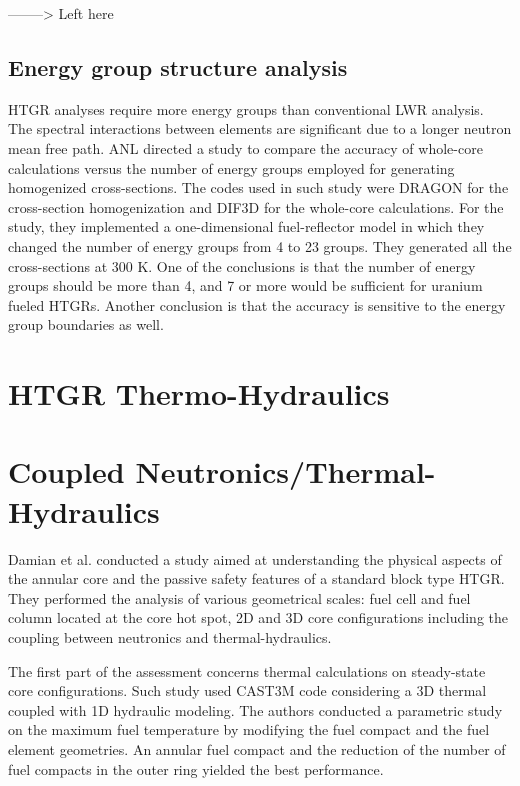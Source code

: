 \documentclass[11pt,letterpaper]{article}
\begin{document}
--------> Left here




\subsection{Energy group structure analysis}

\gls{HTGR} analyses require more energy groups than conventional \gls{LWR} analysis.
The spectral interactions between elements are significant due to a longer neutron mean free path.
\gls{ANL} directed a study \cite{lee_status_2006} to compare the accuracy of whole-core calculations versus the number of energy groups employed for generating homogenized cross-sections.
The codes used in such study were DRAGON for the cross-section homogenization and DIF3D for the whole-core calculations.
For the study, they implemented a one-dimensional fuel-reflector model in which they changed the number of energy groups from 4 to 23 groups.
They generated all the cross-sections at 300 K.
One of the conclusions is that the number of energy groups should be more than 4, and 7 or more would be sufficient for uranium fueled \glspl{HTGR}.
Another conclusion is that the accuracy is sensitive to the energy group boundaries as well.


\section{HTGR Thermo-Hydraulics}







\section{Coupled Neutronics/Thermal-Hydraulics}

Damian et al. \cite{damian_vhtr_2008} conducted a study aimed at understanding the physical aspects of the annular core and the passive safety features of a standard block type \gls{HTGR}.
They performed the analysis of various geometrical scales: fuel cell and fuel column located at the core hot spot, 2D and 3D core configurations including the coupling between neutronics and thermal-hydraulics.

The first part of the assessment concerns thermal calculations on steady-state core configurations.
Such study used CAST3M \cite{studer_cast3marcturus_2007} code considering a 3D thermal coupled with 1D hydraulic modeling.
The authors conducted a parametric study on the maximum fuel temperature by modifying the fuel compact and the fuel element geometries.
An annular fuel compact and the reduction of the number of fuel compacts in the outer ring yielded the best performance.
\end{document}
